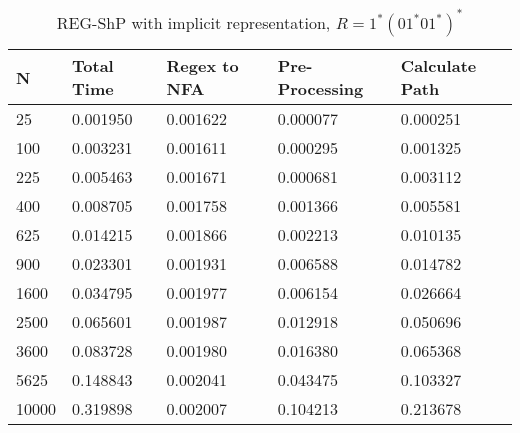 \documentclass[]{article}
\numberwithin{equation}{section}
\begin{document}
\begin{appendices}
\begin{table}[H]
	\centering
	\small
	\setlength\tabcolsep{2pt}
	\begin{tabular}{|l|l|l|l|l|}
		\hline
		N     & Total Time & Regex to NFA & Pre-Processing & Calculate Path  \\ \hline
		25    & 0.001950   & 0.001622     & 0.000077       & 0.000251        \\ \hline
		100   & 0.003231   & 0.001611     & 0.000295       & 0.001325        \\ \hline
		225   & 0.005463   & 0.001671     & 0.000681       & 0.003112        \\ \hline
		400   & 0.008705   & 0.001758     & 0.001366       & 0.005581        \\ \hline
		625   & 0.014215   & 0.001866     & 0.002213       & 0.010135        \\ \hline
		900   & 0.023301   & 0.001931     & 0.006588       & 0.014782        \\ \hline
		1600  & 0.034795   & 0.001977     & 0.006154       & 0.026664        \\ \hline
		2500  & 0.065601   & 0.001987     & 0.012918       & 0.050696        \\ \hline
		3600  & 0.083728   & 0.001980     & 0.016380       & 0.065368        \\ \hline
		5625  & 0.148843   & 0.002041     & 0.043475       & 0.103327        \\ \hline
		10000 & 0.319898   & 0.002007     & 0.104213       & 0.213678        \\ \hline
	\end{tabular}
	\caption{REG-ShP with implicit representation, $R = 1^*(01^*01^*)^*$}
\end{table}


\end{appendices}
\end{document}
